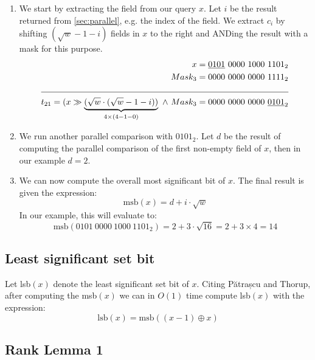 \begin{enumerate}
    \item
    We start by extracting the field from our query $x$. Let $i$ be the result returned from \ref{sec:parallel}, e.g. the index of the field. We extract $c_i$ by shifting $(\sqrt{w} - 1 - i)$ fields in $x$ to the right and ANDing the result with a mask for this purpose.
    \begin{align*}
        x = \underline{0101}\ 0000\ 1000\ 1101_2 &\\
        Mask_3 = 0000\ 0000\ 0000\ 1111_2 &\\
        \cline{1-2}
        t_{21} = (x \gg \underbrace{(\sqrt{w} \cdot (\sqrt{w} - 1 - i))}_{4\times(4-1-0)}\ \wedge\ Mask_3 = 0000\ 0000\ 0000\ \underline{0101}_2 &
    \end{align*}
    \item
    We run another parallel comparison with $0101_2$. Let $d$ be the result of computing the parallel comparison of the first non-empty field of $x$, then in our example $d = 2$.
    \item
    We can now compute the overall most significant bit of $x$. The final result is given the expression:
    \begin{equation*}
        \text{msb}(x) = d + i\cdot\sqrt{w}
    \end{equation*}
    In our example, this will evaluate to:
    \begin{equation*}
        \text{msb}(0101\ 0000\ 1000\ 1101_2) = 2 + 3\cdot\sqrt{16} = 2 + 3 \times 4 = 14
    \end{equation*}
\end{enumerate}

\subsection{Least significant set bit}

Let lsb$(x)$ denote the least significant set bit of $x$. Citing Pătrașcu and Thorup, after computing the msb$(x)$ we can in $O(1)$ time compute lsb$(x)$ with the expression:
\begin{equation*}
    \text{lsb}(x) = \text{msb}((x - 1) \oplus x)
\end{equation*}

\subsection{Rank Lemma 1}

